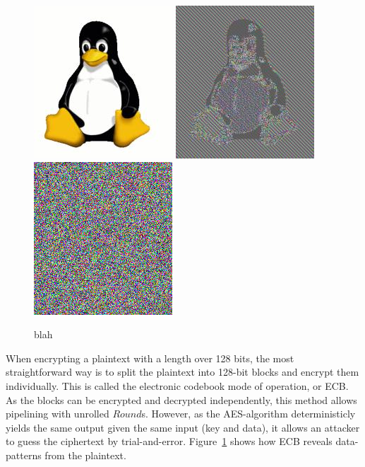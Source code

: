 \begin{figure}[htbb]
  \subfigure{\label{fig:ecbpicta}}
  \includegraphics{tux.jpeg}
  \subfigure{\label{fig:ecbpictb}}
  \includegraphics{tux_ecb.jpeg}
  \subfigure{\label{fig:ecbpictc}}
  \includegraphics{noise.png}
  \caption{blah}
  \label{fig:ecbpict}
\end{figure}

When encrypting a plaintext with a length over 128 bits, the most
straightforward way is to split the plaintext into 128-bit blocks and
encrypt them individually. This is called the electronic codebook mode
of operation, or ECB. As the blocks can be encrypted and decrypted
independently, this method allows pipelining with unrolled
$Round$s. However, as the AES-algorithm deterministicly yields the
same output given the same input (key and data), it allows an attacker
to guess the ciphertext by trial-and-error. Figure~\ref{fig:ecbpict}
shows how ECB reveals data-patterns from the plaintext.

